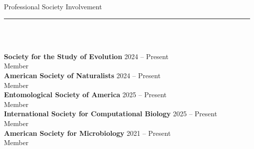 \documentclass{article}
\begin{document}
\begin{flushleft}
    {\Large Professional Society Involvement} \rule{16.51cm}{0.4pt}\\
    \end{flushleft}
    \\


\textbf{Society for the Study of Evolution} \hfill 2024 – Present\\
Member \\
\textbf{American Society of Naturalists} \hfill 2024 – Present\\
Member \\
\textbf{Entomological Society of America} \hfill 2025 – Present\\
Member \\
\textbf{International Society for Computational Biology} \hfill 2025 – Present\\
Member \\
\textbf{American Society for Microbiology} \hfill 2021 – Present\\
Member \\
\end{document}
